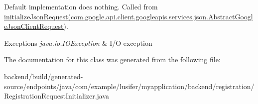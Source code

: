 Default implementation does nothing. Called from \hyperlink{}{initialize\+Json\+Request(com.\+google.\+api.\+client.\+googleapis.\+services.\+json.\+Abstract\+Google\+Json\+Client\+Request)}. 


\begin{DoxyExceptions}{Exceptions}
{\em java.\+io.\+I\+O\+Exception} & I/\+O exception \\
\hline
\end{DoxyExceptions}


The documentation for this class was generated from the following file\+:\begin{DoxyCompactItemize}
\item 
backend/build/generated-\/source/endpoints/java/com/example/lusifer/myapplication/backend/registration/Registration\+Request\+Initializer.\+java\end{DoxyCompactItemize}
